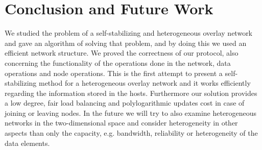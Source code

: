 \documentclass[11pt]{article}
\begin{document}
\section{Conclusion and Future Work}

We studied the problem of a self-stabilizing and heterogeneous overlay network and gave an algorithm of solving that problem, and by doing this we used an efficient network structure. We proved the correctness of our protocol, also concerning the functionality of the operations done in the network, data operations and node operations. This is the first attempt to present a self-stabilizing method for a heterogeneous overlay network and it works efficiently regarding the information stored in the hosts. Furthermore our solution provides a low degree, fair load balancing and polylogarithmic updates cost in case of joining or leaving nodes.
In the future we will try to also examine heterogeneous networks in the two-dimensional space and consider heterogeneity in other aspects than only the capacity, e.g. bandwidth, reliability or heterogeneity of the data elements. 
\end{document}
